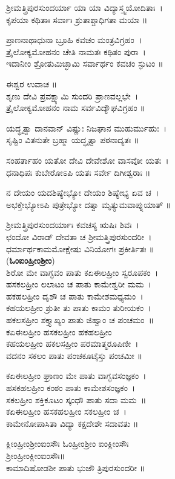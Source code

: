 ಶ್ರೀಮತ್ತ್ರಿಪುರಸುಂದರ್ಯಾ ಯಾ ಯಾ ವಿದ್ಯಾಸ್ತ್ವಯೋದಿತಾಃ~।\\
ಕೃಪಯಾ ಕಥಿತಾಃ ಸರ್ವಾಃ ಶ್ರುತಾಶ್ಚಾಧಿಗತಾ ಮಯಾ ॥

ಪ್ರಾಣನಾಥಾಧುನಾ ಬ್ರೂಹಿ ಕವಚಂ ಮಂತ್ರವಿಗ್ರಹಂ~।\\
ತ್ರೈಲೋಕ್ಯಮೋಹನಂ ಚೇತಿ ನಾಮತಃ ಕಥಿತಂ ಪುರಾ~।\\
ಇದಾನೀಂ ಶ್ರೋತುಮಿಚ್ಛಾಮಿ ಸರ್ವಾರ್ಥಂ ಕವಚಂ ಸ್ಫುಟಂ ॥

ಈಶ್ವರ ಉವಾಚ ॥\\
ಶೃಣು ದೇವಿ ಪ್ರವಕ್ಷ್ಯಾಮಿ ಸುಂದರಿ ಪ್ರಾಣವಲ್ಲಭೇ~।\\
ತ್ರೈಲೋಕ್ಯಮೋಹನಂ ನಾಮ ಸರ್ವವಿದ್ಯೌಘವಿಗ್ರಹಂ ॥

ಯದ್ಧೃತ್ವಾ ದಾನವಾನ್ ವಿಷ್ಣುಃ ನಿಜಘಾನ ಮುಹುರ್ಮುಹುಃ~।\\
ಸೃಷ್ಟಿಂ ವಿತನುತೇ ಬ್ರಹ್ಮಾ ಯದ್ಧೃತ್ವಾ ಪಠನಾದ್ಯತಃ ॥

ಸಂಹರ್ತಾಹಂ ಯತೋ ದೇವಿ ದೇವೇಶೋ ವಾಸವೋ ಯತಃ~।\\
ಧನಾಧಿಪಃ ಕುಬೇರೋಽಪಿ ಯತಃ ಸರ್ವೇ ದಿಗೀಶ್ವರಾಃ ॥

ನ ದೇಯಂ ಯದಶಿಷ್ಯೇಭ್ಯೋ ದೇಯಂ ಶಿಷ್ಯೇಭ್ಯ ಏವ ಚ~।\\
ಅಭಕ್ತೇಭ್ಯೋಽಪಿ ಪುತ್ರೇಭ್ಯೋ ದತ್ವಾ ಮೃತ್ಯುಮವಾಪ್ನುಯಾತ್ ॥

ಶ್ರೀಮತ್ತ್ರಿಪುರಸುಂದರ್ಯಾಃ ಕವಚಸ್ಯ ಋಷಿಃ ಶಿವಃ~।\\
ಛಂದೋ ವಿರಾಡ್ ದೇವತಾ ಚ ಶ್ರೀಮತ್ತ್ರಿಪುರಸುಂದರೀ~।\\
ಧರ್ಮಾರ್ಥಕಾಮಮೋಕ್ಷೇಷು ವಿನಿಯೋಗಃ ಪ್ರಕೀರ್ತಿತಃ ॥\\
({\bfseries ಓಂಐಂಹ್ರೀಂಶ್ರೀಂ})\\
ಶಿರೋ ಮೇ ವಾಗ್ಭವಂ ಪಾತು ಕಏಈಲಹ್ರೀಂ ಸ್ವರೂಪಕಂ~।\\
ಹಸಕಲಹ್ರೀಂ ಲಲಾಟಂ ಚ ಪಾತು ಕಾಮೇಶ್ವರೀ ಮಮ~।\\
ಹಕಹಲಹ್ರೀಂ ದೃಶೌ ಚ ಪಾತು ಕಾಮೇಶಮಧ್ಯಮಂ~।\\
ಕಹಯಲಹ್ರೀಂ ಶ್ರುತೀ ತು ಪಾತು ಕಾಮಂ ತುರೀಯಕಂ~।\\
ಹಕಲಸಹ್ರೀಂ ಶಕ್ತ್ಯಾಖ್ಯಂ ಪಾತು ಜಿಹ್ವಾಂ ಚ ಪಂಚಮಂ~॥\\
ಕಏಈಲಹ್ರೀಂ ಹಸಕಲಹ್ರೀಂ ಹಕಹಲಹ್ರೀಂ\\
ಕಹಯಲಹ್ರೀಂ ಹಕಲಸಹ್ರೀಂ  ಪರಮಾತ್ಮರೂಪಿಣೀ~।\\
ವದನಂ ಸಕಲಂ ಪಾತು ಪಂಚಕೂಟೈಸ್ತು ಪಂಚಮೀ ॥

ಕಏಈಲಹ್ರೀಂ ಘ್ರಾಣಂ ಮೇ ಪಾತು ವಾಗ್ಭವಸಂಜ್ಞಕಂ~।\\
ಹಸಕಹಲಹ್ರೀಂ ಕಂಠಂ ಪಾತು ಕಾಮೇಶಸಂಜ್ಞಕಂ~।\\
ಸಕಲಹ್ರೀಂ ಶಕ್ತಿಕೂಟಂ ಸ್ಕಂಧೌ ಪಾತು ಸದಾ ಮಮ~॥\\
ಕಏಈಲಹ್ರೀಂ ಹಸಕಹಲಹ್ರೀಂ ಸಕಲಹ್ರೀಂ ಚ~।\\
ಕಾಮೇನೋಪಾಸಿತಾ ವಿದ್ಯಾ ಕಕ್ಷದೇಶೇ ಸದಾವತು ॥

ಕ್ಲೀಂಹ್ರೀಂಶ್ರೀಂಐಂಸೌಃ ಓಂಹ್ರೀಂಶ್ರೀಂ ಐಂಕ್ಲೀಂಸೌಃ\\ ಶ್ರೀಂಹ್ರೀಂಕ್ಲೀಂಐಂಸೌಃ॥\\
ಕಾಮಾದಿಷೋಡಶೀ ಪಾತು ಭುಜೌ ತ್ರಿಪುರಸುಂದರೀ ॥

